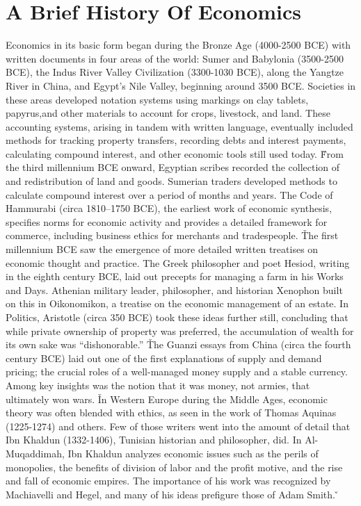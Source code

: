 \section{A Brief History Of Economics}

Economics in its basic form began during the Bronze Age (4000-2500 BCE) with written documents in four areas of the
world: Sumer and Babylonia (3500-2500 BCE), the Indus River Valley Civilization (3300-1030 BCE), along the Yangtze
River in China, and Egypt's Nile Valley, beginning around 3500 BCE. Societies in these areas developed notation
systems using markings on clay tablets, papyrus,and other materials to account for crops, livestock, and land. These
accounting systems, arising in tandem with written language, eventually included methods for tracking property
transfers, recording debts and interest payments, calculating compound interest, and other economic tools still used
today. \v

From the third millennium BCE onward, Egyptian scribes recorded the collection of and redistribution of land and
goods. Sumerian traders developed methods to calculate compound interest over a period of months and years. The Code
of Hammurabi (circa 1810–1750 BCE), the earliest work of economic synthesis, specifies norms for economic activity
and provides a detailed framework for commerce, including business ethics for merchants and tradespeople. \v

The first millennium BCE saw the emergence of more detailed written treatises on economic thought and practice. The
Greek philosopher and poet Hesiod, writing in the eighth century BCE, laid out precepts for managing a farm in his
Works and Days. Athenian military leader, philosopher, and historian Xenophon built on this in Oikonomikon, a
treatise on the economic management of an estate. In Politics, Aristotle (circa 350 BCE) took these ideas further
still, concluding that while private ownership of property was preferred, the accumulation of wealth for its own sake
was ``dishonorable.'' \v

The Guanzi essays from China (circa the fourth century BCE) laid out one of the first explanations of supply and
demand pricing; the crucial roles of a well-managed money supply and a stable currency. Among key insights was the
notion that it was money, not armies, that ultimately won wars. \v

In Western Europe during the Middle Ages, economic theory was often blended with ethics, as seen in the work of
Thomas Aquinas (1225-1274) and others. Few of those writers went into the amount of detail that Ibn Khaldun
(1332-1406), Tunisian historian and philosopher, did. In Al-Muqaddimah, Ibn Khaldun analyzes economic issues such as
the perils of monopolies, the benefits of division of labor and the profit motive, and the rise and fall of economic
empires. The importance of his work was recognized by Machiavelli and Hegel, and many of his ideas prefigure those of
Adam Smith. \v

